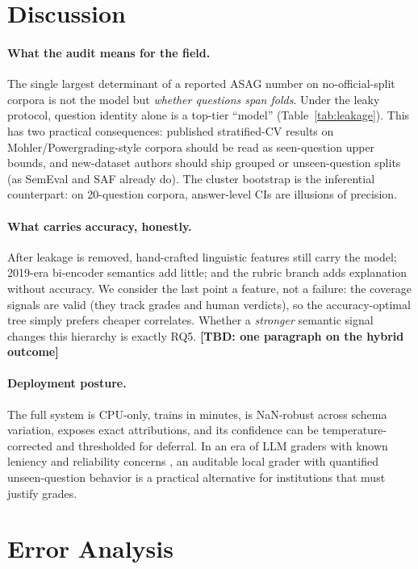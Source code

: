 \documentclass[11pt]{article}
\newcommand{\TBD}[1]{\textbf{[TBD: #1]}}
\begin{document}
\section{Discussion}
\label{sec:discussion}

\paragraph{What the audit means for the field.}
The single largest determinant of a reported ASAG number on
no-official-split corpora is not the model but \emph{whether questions span
folds}. Under the leaky protocol, question identity alone is a
top-tier ``model'' (Table~\ref{tab:leakage}). This has two practical
consequences: published stratified-CV results on Mohler/Powergrading-style
corpora should be read as seen-question upper bounds, and new-dataset authors
should ship grouped or unseen-question splits (as SemEval and SAF already do).
The cluster bootstrap is the inferential counterpart: on 20-question corpora,
answer-level CIs are illusions of precision.

\paragraph{What carries accuracy, honestly.}
After leakage is removed, hand-crafted linguistic features still carry the
model; 2019-era bi-encoder semantics add little; and the rubric branch adds
explanation without accuracy. We consider the last point a feature, not a
failure: the coverage signals are valid (they track grades and human
verdicts), so the accuracy-optimal tree simply prefers cheaper correlates.
Whether a \emph{stronger} semantic signal changes this hierarchy is exactly
RQ5. \TBD{one paragraph on the hybrid outcome}

\paragraph{Deployment posture.}
The full system is CPU-only, trains in minutes, is NaN-robust across schema
variation, exposes exact attributions, and its confidence can be temperature-
corrected and thresholded for deferral. In an era of LLM graders with known
leniency and reliability concerns \cite{chamieh2024llms,ferreiramello2025gpt4},
an auditable local grader with quantified unseen-question behavior is a
practical alternative for institutions that must justify grades.

\section{Error Analysis}
\label{sec:error}
\end{document}
